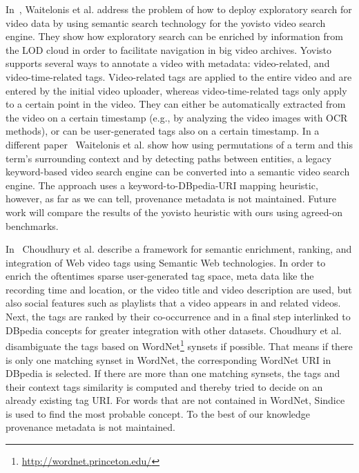 \documentclass{acm_proc_article-sp}
\begin{document}
In~\cite{Sack:VideoSearch}, Waitelonis et al. address the problem of how to deploy exploratory search for video data by using semantic search technology for the yovisto video search engine. They show how exploratory search can be enriched by information from the LOD cloud in order to facilitate navigation in big video archives. Yovisto supports several ways to annotate a video with metadata: video-related, and video-time-related tags. Video-related tags are applied to the entire video and are entered by the initial video uploader, whereas video-time-related tags only apply to a certain point in the video. They can either be automatically extracted from the video on a certain timestamp (e.g., by analyzing the video images with OCR methods), or can be user-generated tags also on a certain timestamp. In a different paper~\cite{Sack:Use} Waitelonis et al. show how using permutations of a term and this term's surrounding context and by detecting paths between entities, a legacy keyword-based video search engine can be converted into a semantic video search engine. The approach uses a keyword-to-DBpedia-URI mapping heuristic, however, as far as we can tell, provenance metadata is not maintained. Future work will compare the results of the yovisto heuristic with ours using agreed-on benchmarks.

In~\cite{Choudhury:YouTube} Choudhury et al. describe a framework for semantic enrichment, ranking, and integration of Web video tags using Semantic Web technologies. In order to enrich the oftentimes sparse user-generated tag space, meta data like the recording time and location, or the video title and video description are used, but also social features such as playlists that a video appears in and related videos. Next, the tags are ranked by their co-occurrence and in a final step interlinked to DBpedia concepts for greater integration with other datasets. Choudhury et al. disambiguate the tags based on WordNet\footnote{\url{http://wordnet.princeton.edu/}} synsets if possible. That means if there is only one matching synset in WordNet, the corresponding WordNet URI in DBpedia is selected. If there are more than one matching synsets, the tags and their context tags similarity is computed and thereby tried to decide on an already existing tag URI. For words that are not contained in WordNet, Sindice is used to find the most probable concept. To the best of our knowledge provenance metadata is not maintained.
\end{document}

